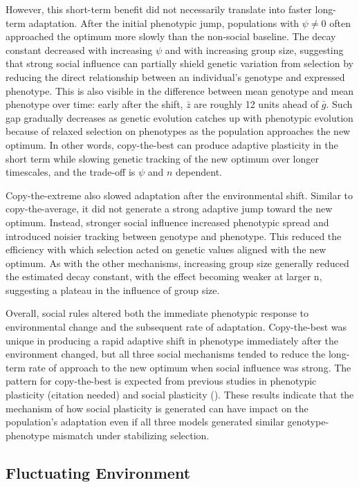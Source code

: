 \documentclass{article}
\begin{document}
However, this short-term benefit did not necessarily translate into faster long-term adaptation. After the initial phenotypic jump, populations with $\psi\neq 0$ often approached the optimum more slowly than the non-social baseline. The decay constant decreased with increasing $\psi$ and with increasing group size, suggesting that strong social influence can partially shield genetic variation from selection by reducing the direct relationship between an individual’s genotype and expressed phenotype. This is also visible in the difference between mean genotype and mean phenotype over time: early after the shift, $\bar{z}$ are roughly 12 units ahead of $\bar{g}$. Such gap gradually decreases as genetic evolution catches up with phenotypic evolution because of relaxed selection on phenotypes as the population approaches the new optimum. In other words, copy-the-best can produce adaptive plasticity in the short term while slowing genetic tracking of the new optimum over longer timescales, and the trade-off is $\psi$ and $n$ dependent.

Copy-the-extreme also slowed adaptation after the environmental shift. Similar to copy-the-average, it did not generate a strong adaptive jump toward the new optimum. Instead, stronger social influence increased phenotypic spread and introduced noisier tracking between genotype and phenotype. This reduced the efficiency with which selection acted on genetic values aligned with the new optimum. As with the other mechanisms, increasing group size generally reduced the estimated decay constant, with the effect becoming weaker at larger n, suggesting a plateau in the influence of group size.

Overall, social rules altered both the immediate phenotypic response to environmental change and the subsequent rate of adaptation. Copy-the-best was unique in producing a rapid adaptive shift in phenotype immediately after the environment changed, but all three social mechanisms tended to reduce the long-term rate of approach to the new optimum when social influence was strong. The pattern for copy-the-best is expected from previous studies in phenotypic plasticity (citation needed) and social plasticity (\cite{Martin2025}). These results indicate that the mechanism of how social plasticity is generated can have impact on the population's adaptation even if all three models generated similar genotype-phenotype mismatch under stabilizing selection. 

\subsection{Fluctuating Environment}
\end{document}
